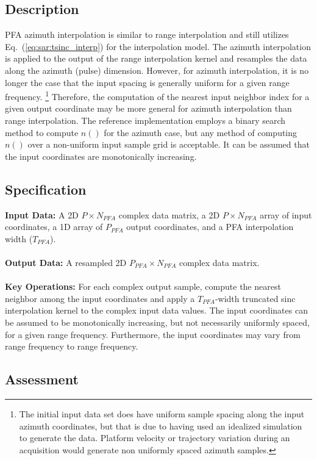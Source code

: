 \documentclass{report}
\begin{document}
\subsection{Description}

PFA azimuth interpolation is similar to range interpolation and still utilizes
Eq.~(\ref{eq:sar:tsinc_interp}) for the interpolation model.
The azimuth interpolation is applied to the output of the range interpolation
kernel and resamples the data along the azimuth (pulse) dimension.
However, for azimuth interpolation, it is no longer the case that
the input spacing is generally uniform for a given range frequency.%
\footnote{The initial input data set does have uniform sample spacing
along the input azimuth coordinates, but that is due to having used an
idealized simulation to generate the data. Platform velocity or trajectory
variation during an acquisition would generate non uniformly spaced
azimuth samples.}
Therefore, the computation of the nearest input neighbor index for a given
output coordinate may be more general for azimuth interpolation than
range interpolation.
The reference implementation employs a binary search method to compute
$n()$ for the azimuth case, but any method of computing $n()$ over a
non-uniform input sample grid is acceptable.
It can be assumed that the input coordinates are monotonically increasing.

\subsection{Specification}

\textbf{Input Data:} A {2D} $P \times N_{PFA}$ complex data matrix,
a {2D} $P \times N_{PFA}$ array of input coordinates, a {1D} array
of $P_{PFA}$ output coordinates, and a PFA interpolation width ($T_{PFA}$). \\ \\
\textbf{Output Data:} 
A resampled {2D} $P_{PFA} \times N_{PFA}$ complex data matrix. \\ \\
\textbf{Key Operations:} For each complex output sample, compute the nearest neighbor among
the input coordinates and apply a $T_{PFA}$-width truncated sinc interpolation kernel
to the complex input data values.
The input coordinates can be assumed to be monotonically increasing, but not necessarily
uniformly spaced, for a given range frequency.
Furthermore, the input coordinates may vary from range frequency to range frequency.

\subsection{Assessment}
\end{document}
